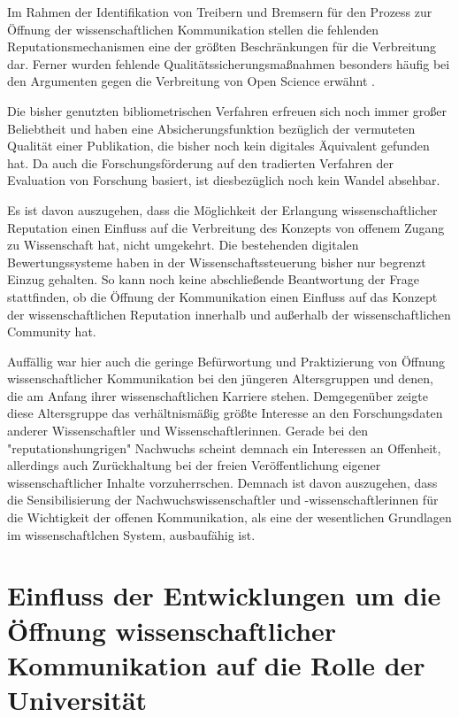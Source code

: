Im Rahmen der Identifikation von Treibern und Bremsern für den Prozess zur Öffnung der wissenschaftlichen Kommunikation stellen die fehlenden Reputationsmechanismen eine der größten Beschränkungen für die Verbreitung dar. Ferner wurden fehlende Qualitätssicherungsmaßnahmen besonders häufig bei den Argumenten gegen die Verbreitung von Open Science erwähnt \cite{eu_open_science_2015}.

Die bisher genutzten bibliometrischen Verfahren erfreuen sich noch immer großer Beliebtheit und haben eine Absicherungsfunktion bezüglich der vermuteten Qualität einer Publikation, die bisher noch kein digitales Äquivalent gefunden hat. Da auch die Forschungsförderung auf den tradierten Verfahren der Evaluation von Forschung basiert, ist diesbezüglich noch kein Wandel absehbar.

Es ist davon auszugehen, dass die Möglichkeit der Erlangung wissenschaftlicher Reputation einen Einfluss auf die Verbreitung des Konzepts von offenem Zugang zu Wissenschaft hat, nicht umgekehrt. Die bestehenden digitalen Bewertungssysteme haben in der Wissenschaftssteuerung bisher nur begrenzt Einzug gehalten. So kann noch keine abschließende Beantwortung der Frage stattfinden, ob die Öffnung der Kommunikation einen Einfluss auf das Konzept der wissenschaftlichen Reputation innerhalb und außerhalb der wissenschaftlichen Community hat.

Auffällig war hier auch die geringe Befürwortung und Praktizierung von Öffnung wissenschaftlicher Kommunikation bei den jüngeren Altersgruppen und denen, die am Anfang ihrer wissenschaftlichen Karriere stehen. Demgegenüber zeigte diese Altersgruppe das verhältnismäßig größte Interesse an den Forschungsdaten anderer Wissenschaftler und Wissenschaftlerinnen. Gerade bei den "reputationshungrigen" Nachwuchs scheint demnach ein Interessen an Offenheit, allerdings auch Zurückhaltung bei der freien Veröffentlichung eigener wissenschaftlicher Inhalte vorzuherrschen. Demnach ist davon auszugehen, dass die Sensibilisierung der Nachwuchswissenschaftler und -wissenschaftlerinnen für die Wichtigkeit der offenen Kommunikation, als eine der wesentlichen Grundlagen im wissenschaftlchen System, ausbaufähig ist.

\section{Einfluss der Entwicklungen um die Öffnung wissenschaftlicher Kommunikation auf die Rolle der Universität}

